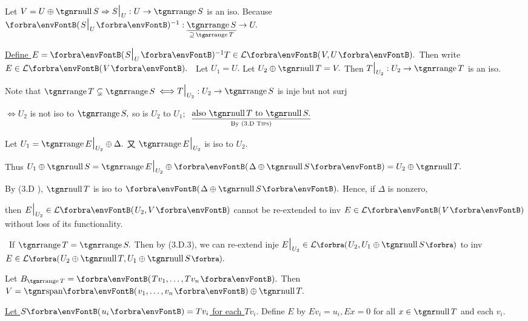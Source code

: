 \par\quad
Let $V=U\oplus\null S\Rightarrow S\mmid_U:U\rightarrow\range S$ is an iso. Because $\Par{S\mmid_U}{^{-1}}:\underset{\supseteq\,\range T}{\uline{\range S}}\rightarrow U.$\par\vspace{-10pt}\quad
\uline{Define $E=\Par{S\mmid_U}{^{-1}}T\in\Lm{V,U}.$} Then write $E\in\Lm{V}.$\PfEnd\vspace{4pt}\quad
\Comment \,\,\,Let $U_1=U.$ Let $U_2\oplus\null T=V.$ Then $T\mmid_{U_2}:U_2\rightarrow\range T$ is an iso.\par\quad
Note that $\range T\subsetneq\range S$ $\Longleftrightarrow T\mmid_{U_2}:U_2\rightarrow\range S$  is inje but not surj\par\quad
{}$\Longleftrightarrow U_2$ is not iso to $\range S,$ so is $U_2$ to $U_1;\;$ $\underset{\text{By (3.D }\textsc{Tips}\text{)}}{\uline{\text{also }\null T\text{ to }\null S.}}$\par\vspace{-6pt}\quad
Let $U_1=\range E\mmid_{U_2}\oplus\Delta.$ 又 $\range E\mmid_{U_2}$ is iso to $U_2.$\par\quad
Thus $U_1\oplus\null S=\range E\mmid_{U_2}\oplus\Par{\Delta\oplus\null S}=U_2\oplus\null T.$\par\quad
By (3.D \TIPS), $\null T$ is iso to $\Par{\Delta\oplus\null S}.$ Hence, if $\Delta$ is nonzero,\par\quad
then $E\mmid_{U_2}\in\Lm{U_2,V}$ cannot be re-extended to inv $E\in\Lm{V}$ without loss of its functionality.\par\vspace{4pt}\quad
\Corollary \,\,\,If $\range T=\range S.$ Then by (3.D.3), we can re-extend inje $E\mmid_{U_2}\in\Lm[\BigPar]{U_2,U_1\oplus\null S}$\parCor\quad
to inv $E\in\Lm[\BigPar]{U_2\oplus\null T,U_1\oplus\null S}.$\par\vspace{6pt}\quad
\Or {} \;Let $B_{\range T}=\Par{Tv_1,\dots,Tv_n}.$ Then \uline{$V=\Span{v_1,\dots,v_n}\oplus\null T.$}\par\quad
\uline{Let $S\Par{u_i}=Tv_i$ for each $Tv_i.$} \;Define $E$ by $Ev_i=u_i,Ex=0$ for all $x\in\null T$ and each $v_i.$\PfEnd\vspace{4pt}\quad

